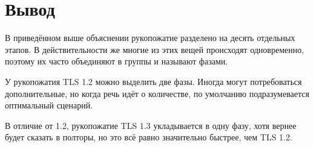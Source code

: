 \section*{Вывод}
В приведённом выше объяснении рукопожатие разделено на десять отдельных этапов. В действительности же многие из этих вещей происходят одновременно, поэтому их часто объединяют в группы и называют фазами.

У рукопожатия TLS 1.2 можно выделить две фазы. Иногда могут потребоваться дополнительные, но когда речь идёт о количестве, по умолчанию подразумевается оптимальный сценарий.

В отличие от 1.2, рукопожатие TLS 1.3 укладывается в одну фазу, хотя вернее будет сказать в полторы, но это всё равно значительно быстрее, чем TLS 1.2.